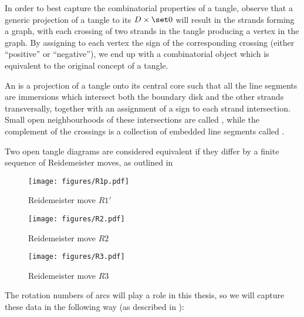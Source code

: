 In order to best capture the combinatorial properties of a tangle, observe that
a generic projection of a tangle to its  $D\times \set 0$
will result in the strands forming a graph, with each crossing of two strands in
the tangle producing a vertex in the graph. By assigning to each vertex the sign
of the corresponding crossing (either \enquote{positive} or \enquote{negative}),
we end up with a combinatorial object which is equivalent to the original
concept of a tangle.

\begin{definition}\label{def:open_tangle_diagram}
        An  is a projection of a tangle onto its
        central core such that all the line segments are immersions which
        intersect both the boundary disk and the other strands transversally,
        together with an assignment of a sign to each strand intersection.
        Small open neighbourhoods of these intersections are called
        , while the complement of the crossings is a collection
        of embedded line segments called .

        Two open tangle diagrams are considered equivalent if they differ by a
        finite sequence of Reidemeister moves, as outlined in
\end{definition}

\begin{figure}[h]
        \centering
        \texttt{[image: figures/R1p.pdf]}
        \caption{Reidemeister move $R1'$}
        \label{fig:R1p}
\end{figure}
\begin{figure}[h]
        \centering
        \texttt{[image: figures/R2.pdf]}
        \caption{Reidemeister move $R2$}
        \label{fig:R2}
\end{figure}
\begin{figure}[h]
        \centering
        \texttt{[image: figures/R3.pdf]}
        \caption{Reidemeister move $R3$}
        \label{fig:R3}
\end{figure}

The rotation numbers of arcs will play a role in this thesis, so we will capture
these data in the following way (as described in \cite{BV23}):

